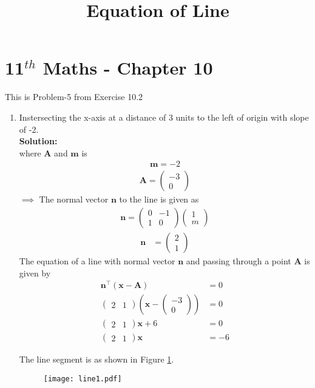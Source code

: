 \documentclass[journal,10pt,twocolumn]{article}
\providecommand{\brak}[1]{\ensuremath{\left(#1\right)}}
\newcommand{\solution}{\noindent \textbf{Solution: }}
\newcommand{\myvec}[1]{\ensuremath{\begin{pmatrix}#1\end{pmatrix}}}
\let\vec\mathbf
\begin{document}
\begin{center}
\title{\textbf{Equation  of Line}}
\date{\vspace{-5ex}} %
\maketitle
\end{center}
\setcounter{page}{1}

\section{11$^{th}$ Maths - Chapter 10}
This is Problem-5 from Exercise 10.2
\begin{enumerate}
\item Instersecting the x-axis at a distance of 3 units to the left of origin with slope of -2.
\\

\solution 
\\

           where $\vec{A}$ and $\vec{m}$ is 
\begin{align}		
\vec{m}=-2
\end{align}
\begin{align}
\vec{A}=\myvec{-3\\0}
\end{align}
$\implies$ The normal vector $\vec{n}$ to the line is given as
\begin{align}
\vec{n}=\myvec{0&-1\\1&0}\myvec{1\\m}
\end{align}
\begin{align}
\vec{n} &= \myvec{2 \\1} 
\end{align}
The equation of a line with normal vector $\vec{n}$ and passing through a point $\vec{A}$ is given by
\begin{align}
	\vec{n}^\top\brak{\vec{x}-\vec{A}} &= 0 \\
	\myvec { 2 & 1 } \brak{ \vec{x} - \myvec{ -3 \\ 0}} &= 0  \\
	\myvec{ 2 & 1} \vec{x} +6 &= 0 \\
        \label{eq:1}
	\myvec{ 2 & 1} \vec{x}  &= -6
\end{align}

 The line segment is as shown in Figure \ref{fig:Fig1}.
\begin{figure}[!h]
	\begin{center}
		\texttt{[image: line1.pdf]}
	\end{center}
\caption{}
\label{fig:Fig1}
\end{figure}

\end{enumerate}
\end{document}
